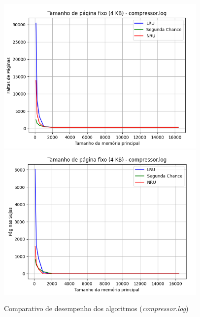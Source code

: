 \documentclass[a4paper, 12pt]{article}
\begin{document}
\begin{figure}[H]
    \centering
    \includegraphics[width=0.92\textwidth]{fixed_pag/compressor/fault.png}
    \hspace{1.5cm}
    \includegraphics[width=0.92\textwidth]{fixed_pag/compressor/write.png}
    \caption{Comparativo de desempenho dos algoritmos (\emph{compressor.log})}
    \label{fig:exampleFig7}
\end{figure}
\end{document}
